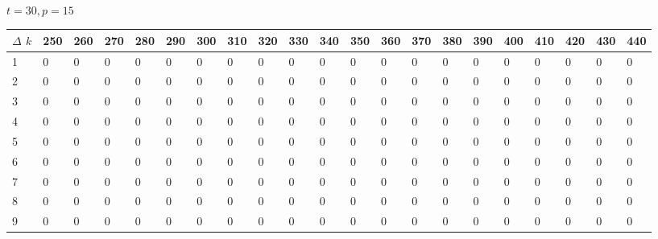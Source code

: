 \documentclass[11pt]{article}
\begin{document}
\paragraph{}
$t =  30, p =  15$
\begin{center} \tiny \begin{tabular}{|l |l |l |l |l |l |l |l |l |l |l |l |l |l |l |l |l |l |l |l |l |} \hline
$\Delta$ $k$ &250 & 260 & 270 & 280 & 290 & 300 & 310 & 320 & 330 & 340 & 350 & 360 & 370 & 380 & 390 & 400 & 410 & 420 & 430 & 440  \\ \hline
1 & 0 & 0 & 0 & 0 & 0 & 0 & 0 & 0 & 0 & 0 & 0 & 0 & 0 & 0 & 0 & 0 & 0 & 0 & 0 & 0  \\ \hline
2 & 0 & 0 & 0 & 0 & 0 & 0 & 0 & 0 & 0 & 0 & 0 & 0 & 0 & 0 & 0 & 0 & 0 & 0 & 0 & 0  \\ \hline
3 & 0 & 0 & 0 & 0 & 0 & 0 & 0 & 0 & 0 & 0 & 0 & 0 & 0 & 0 & 0 & 0 & 0 & 0 & 0 & 0  \\ \hline
4 & 0 & 0 & 0 & 0 & 0 & 0 & 0 & 0 & 0 & 0 & 0 & 0 & 0 & 0 & 0 & 0 & 0 & 0 & 0 & 0  \\ \hline
5 & 0 & 0 & 0 & 0 & 0 & 0 & 0 & 0 & 0 & 0 & 0 & 0 & 0 & 0 & 0 & 0 & 0 & 0 & 0 & 0  \\ \hline
6 & 0 & 0 & 0 & 0 & 0 & 0 & 0 & 0 & 0 & 0 & 0 & 0 & 0 & 0 & 0 & 0 & 0 & 0 & 0 & 0  \\ \hline
7 & 0 & 0 & 0 & 0 & 0 & 0 & 0 & 0 & 0 & 0 & 0 & 0 & 0 & 0 & 0 & 0 & 0 & 0 & 0 & 0  \\ \hline
8 & 0 & 0 & 0 & 0 & 0 & 0 & 0 & 0 & 0 & 0 & 0 & 0 & 0 & 0 & 0 & 0 & 0 & 0 & 0 & 0  \\ \hline
9 & 0 & 0 & 0 & 0 & 0 & 0 & 0 & 0 & 0 & 0 & 0 & 0 & 0 & 0 & 0 & 0 & 0 & 0 & 0 & 0  \\ \hline
\end{tabular}\end{center}
\end{document}
